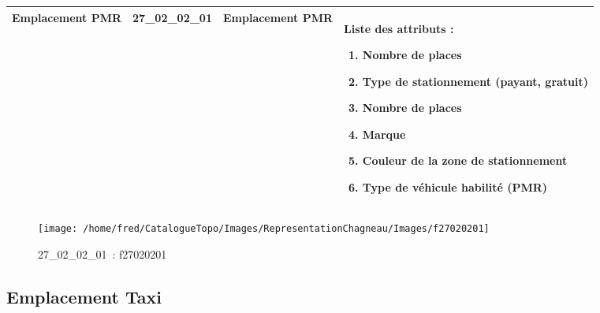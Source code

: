 \documentclass[12pt,titlepage]{book}
\begin{document}
\renewcommand{\arraystretch}{1.2}
\begin{supertabular}{|p{10cm}|c|p{13cm}|p{12cm}|}
 Emplacement PMR & 27\_02\_02\_01 & Emplacement PMR & Liste des attributs :
\begin{enumerate}
  \item Nombre de places  \item Type de stationnement (payant, gratuit)  \item Nombre de places  \item Marque  \item Couleur de la zone de stationnement  \item Type de véhicule habilité (PMR)\end{enumerate}
\\
\hline
\end{supertabular}
\begin{figure}[h!]
  \hfill         %
  \begin{minipage}[t]{3cm}
    \begin{center}
      \texttt{[image: /home/fred/CatalogueTopo/Images/RepresentationChagneau/Images/f27020201]}
      \caption[~27\_02\_02\_01]{\small{27\_02\_02\_01~:} \tiny{f27020201}}\label{f27020201}
    \end{center}
  \end{minipage}
\end{figure}


\subsection{Emplacement Taxi}
\noindent
\vspace{\baselineskip}
\end{document}
